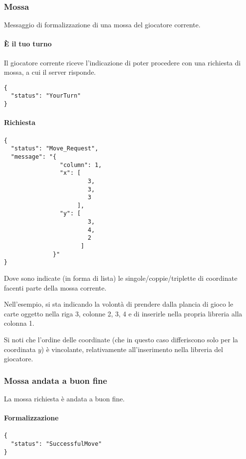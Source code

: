 \documentclass[a4paper,11pt]{article} %
\begin{document}
    \subsubsection{Mossa}
    Messaggio di formalizzazione di una mossa del giocatore corrente.

    \paragraph{È il tuo turno}
    Il giocatore corrente riceve l'indicazione di poter procedere con una richiesta di mossa, a cui il server risponde.
    \begin{verbatim}
{
  "status": "YourTurn"
}
    \end{verbatim}

    \paragraph{Richiesta}
    \begin{verbatim}
{
  "status": "Move_Request",
  "message": "{
                "column": 1,
                "x": [
                        3,
                        3,
                        3
                     ],
                "y": [
                        3,
                        4,
                        2
                      ]
              }"
}
    \end{verbatim}

    Dove sono indicate (in forma di lista) le singole/coppie/triplette di coordinate facenti parte della mossa corrente.

    Nell'esempio, si sta indicando la volontà di prendere dalla plancia di gioco le carte oggetto nella riga 3,
    colonne 2, 3, 4 e di inserirle nella propria libreria alla colonna 1.

    Si noti che l'ordine delle coordinate (che in questo caso differiscono solo per la coordinata $y$) è vincolante, relativamente
    all'inserimento nella libreria del giocatore.

    \newpage

    \subsubsection{Mossa andata a buon fine}
    La mossa richiesta è andata a buon fine.

    \paragraph{Formalizzazione}
    \begin{verbatim}
{
  "status": "SuccessfulMove"
}
    \end{verbatim}
\end{document}
